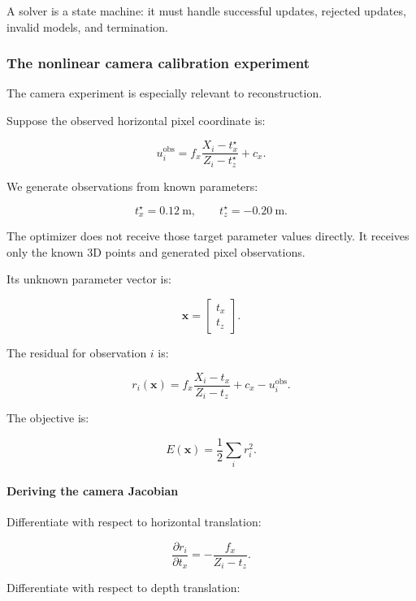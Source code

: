 A solver is a state machine: it must handle successful updates, rejected updates, invalid models, and termination.

\subsubsection{The nonlinear camera calibration experiment}\label{02-foundations-ii-ch028-the-nonlinear-camera-calibration-experiment}

\hypertarget{02-foundations-ii-ch028-the-nonlinear-camera-calibration-experiment}{}

The camera experiment is especially relevant to reconstruction.

Suppose the observed horizontal pixel coordinate is:

\[
u_i^{\mathrm{obs}} = f_x\frac{X_i-t_x^\star}{Z_i-t_z^\star}+c_x.
\]

We generate observations from known parameters:

\[
\boxed{ t_x^\star=0.12\ \mathrm m, \qquad t_z^\star=-0.20\ \mathrm m }.
\]

The optimizer does not receive those target parameter values directly. It receives only the known 3D points and generated pixel observations.

Its unknown parameter vector is:

\[
\mathbf x= \begin{bmatrix} t_x\\t_z \end{bmatrix}.
\]

The residual for observation \(i\) is:

\[
\boxed{ r_i(\mathbf x) = f_x\frac{X_i-t_x}{Z_i-t_z} +c_x-u_i^{\mathrm{obs}} }.
\]

The objective is:

\[
E(\mathbf x)=\frac12\sum_i r_i^2.
\]

\paragraph{Deriving the camera Jacobian}\label{02-foundations-ii-ch028-deriving-the-camera-jacobian}

\hypertarget{02-foundations-ii-ch028-deriving-the-camera-jacobian}{}

Differentiate with respect to horizontal translation:

\[
\boxed{ \frac{\partial r_i}{\partial t_x} = -\frac{f_x}{Z_i-t_z} }.
\]

Differentiate with respect to depth translation:

